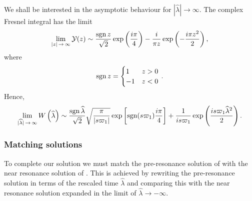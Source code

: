 We shall be interested in the asymptotic behaviour for $|\widehat{\lambda}| \rightarrow \infty$. The complex Fresnel integral has the limit \citep[7.5.3, 7.5.4, 7.12.2, 7.12.3]{Olver2010}
\begin{equation}
\lim_{|z|\,\rightarrow\,\infty} \mathcal{Y}(z) \sim \dfrac{\operatorname{sgn} z}{\sqrt{2}} \exp\left(\dfrac{i\pi}{4}\right) - \dfrac{i}{\pi z}\exp\left(-\dfrac{i\pi z^2}{2}\right),
\end{equation}
where 
\begin{equation}
\operatorname{sgn} z = \begin{cases}
1 & z > 0 \\
-1 & z < 0
\end{cases}\,.
\end{equation}
Hence,
\begin{equation}
\lim_{|\widehat{\lambda}|\,\rightarrow\,\infty}W\left(\widehat{\lambda}\right) \sim \dfrac{\operatorname{sgn} \widehat{\lambda}}{\sqrt{2}}\sqrt{\dfrac{\pi}{|s\varpi_1|}}\exp\left[\operatorname{sgn}(s\varpi_1)\dfrac{i\pi}{4}\right] + \dfrac{1}{is\varpi_1}\exp\left(\dfrac{is \varpi_1 \widehat{\lambda}^2}{2}\right).
\label{eq:Fres-limit}
\end{equation}

\subsubsection{Matching solutions}

To complete our solution we must match the pre-resonance solution of  with the near resonance solution of . This is achieved by rewriting the pre-resonance solution in terms of the rescaled time $\widehat{\lambda}$ and comparing this with the near resonance solution expanded in the limit of $\widehat{\lambda} \rightarrow -\infty$.

